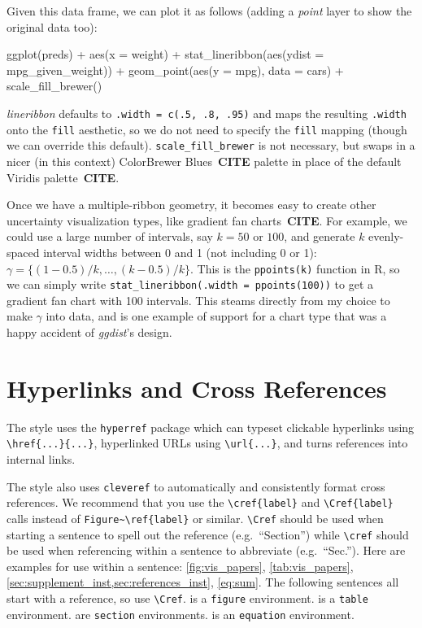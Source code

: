 \documentclass[journal]{vgtc}                     %
\newenvironment{centerverbatim}{%
  \hfill\break
  \small
  \centering
  \varwidth{\linewidth}%
  \verbatim
}{%
  \endverbatim
  \endvarwidth
  \par
  \hfill\break
}
\begin{document}
Given this data frame, we can plot it as follows (adding a \textit{point} layer to show the original data too):

\begin{centerverbatim}
ggplot(preds) +
  aes(x = weight) +
  stat_lineribbon(aes(ydist = mpg_given_weight)) +
  geom_point(aes(y = mpg), data = cars) +
  scale_fill_brewer()
\end{centerverbatim}

\textit{lineribbon} defaults to \texttt{.width = c(.5, .8, .95)} and maps the resulting \texttt{.width} onto the \texttt{fill} aesthetic, so we do not need to specify the \texttt{fill} mapping (though we can override this default). \texttt{scale\_fill\_brewer} is not necessary, but swaps in a nicer (in this context) ColorBrewer Blues~\textbf{CITE} palette in place of the default Viridis palette~\textbf{CITE}.

Once we have a multiple-ribbon geometry, it becomes easy to create other uncertainty visualization types, like gradient fan charts~\textbf{CITE}. For example, we could use a large number of intervals, say $k = 50$ or $100$, and generate $k$  evenly-spaced interval widths between 0 and 1 (not including 0 or 1): $\gamma = \{(1 - 0.5)/k, \dots, (k - 0.5)/k\}$. This is the \texttt{ppoints(k)} function in R, so we can simply write \texttt{stat\_lineribbon(.width = ppoints(100))} to get a gradient fan chart with 100 intervals. This steams directly from my choice to make $\gamma$ into data, and is one example of support for a chart type that was a happy accident of \textit{ggdist}'s design.

 
\section{Hyperlinks and Cross References}

The style uses the \verb|hyperref| package which can typeset clickable hyperlinks using \verb|\href{...}{...}|, hyperlinked URLs using \verb|\url{...}|, and turns references into internal links.

The style also uses \verb|cleveref| to automatically and consistently format cross references.
We recommend that you use the \verb|\cref{label}| and \verb|\Cref{label}| calls instead of \verb|Figure~\ref{label}| or similar.
\verb|\Cref| should be used when starting a sentence to spell out the reference (e.g.\ ``Section'') while \verb|\cref| should be used when referencing within a sentence to abbreviate (e.g.\ ``Sec.'').
Here are examples for use within a sentence: \cref{fig:vis_papers}, \cref{tab:vis_papers}, \cref{sec:supplement_inst,sec:references_inst}, \cref{eq:sum}.
The following sentences all start with a reference, so use \verb|\Cref|.
 is a \verb|figure| environment.
 is a \verb|table| environment.
 are \verb|section| environments.
 is an \verb|equation| environment.
\end{document}
